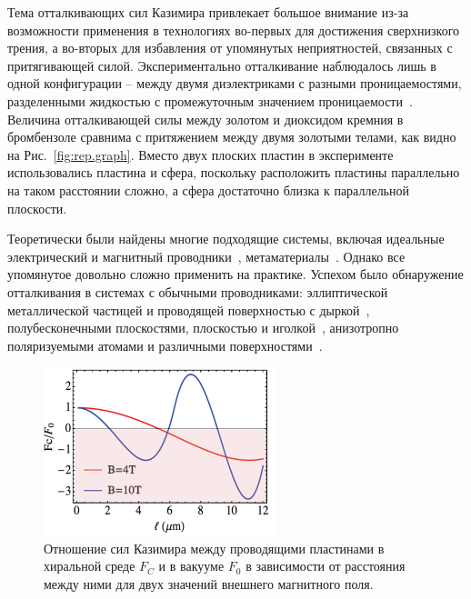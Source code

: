 Тема отталкивающих сил Казимира привлекает большое внимание из-за возможности применения в технологиях во-первых для достижения сверхнизкого трения, а во-вторых для избавления от упомянутых неприятностей, связанных с притягивающей силой. 
Экспериментально отталкивание наблюдалось лишь в одной конфигурации -- между двумя диэлектриками с разными проницаемостями, разделенными жидкостью с промежуточным значением проницаемости~\cite{Repulsion.firstexp}. Величина отталкивающей силы между золотом и диоксидом кремния в бромбензоле сравнима с притяжением между двумя золотыми телами, как видно на Рис.~\ref{fig:rep.graph}. Вместо двух плоских пластин в эксперименте использовались пластина и сфера, поскольку расположить пластины параллельно на таком расстоянии сложно, а сфера достаточно близка к параллельной плоскости. 

Теоретически были найдены многие подходящие системы, включая идеальные электрический и магнитный проводники~\cite{Repulsion.magnetic}, метаматериалы~\cite{Repulsion.metamaterial}. 
Однако все упомянутое довольно сложно применить на практике. 
Успехом было обнаружение отталкивания в системах с обычными проводниками: эллиптической металлической частицей и проводящей поверхностью с дыркой~\cite{Repulsion.aperture}, полубесконечными плоскостями, плоскостью и иголкой~\cite{Repulsion.plates.needle}, анизотропно поляризуемыми атомами и различными поверхностями~\cite{Repulsion.conductors}. 

\begin{figure}
\includegraphics[width=.5\linewidth]{figs/Chiral-Casimir}
\caption{Отношение сил Казимира между проводящими пластинами в хиральной среде $F_C$ и в вакууме $F_0$ в зависимости от расстояния между ними для двух значений внешнего магнитного поля.}
\label{fig:Chiral.Casimir}
\end{figure}

